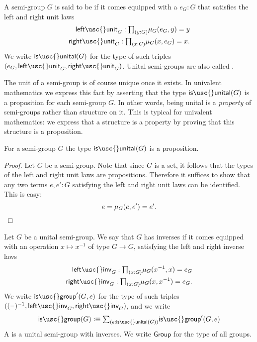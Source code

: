 \begin{defn}
  A semi-group $G$ is said to be  if it comes equipped with a  $e_G:G$ that satisfies the left and right unit laws
  \begin{align*}
    \mathsf{left\usc{}unit}_G : \prd{y:G}\mu_G(e_G,y)=y \\
    \mathsf{right\usc{}unit}_G : \prd{x:G}\mu_G(x,e_G)=x.
  \end{align*}
  We write $\mathsf{is\usc{}unital}(G)$ for the type of such triples $(e_G,\mathsf{left\usc{}unit}_G,\mathsf{right\usc{}unit}_G)$. Unital semi-groups are also called .
\end{defn}

The unit of a semi-group is of course unique once it exists. In univalent mathematics we express this fact by asserting that the type $\mathsf{is\usc{}unital}(G)$ is a proposition for each semi-group $G$. In other words, being unital is a \emph{property} of semi-groups rather than structure on it. This is typical for univalent mathematics: we express that a structure is a property by proving that this structure is a proposition.

\begin{lem}
  For a semi-group $G$ the type $\mathsf{is\usc{}unital}(G)$ is a proposition.
\end{lem}

\begin{proof}
  Let $G$ be a semi-group. Note that since $G$ is a set, it follows that the types of the left and right unit laws are propositions. Therefore it suffices to show that any two terms $e,e':G$ satisfying the left and right unit laws can be identified. This is easy:
  \begin{equation*}
    e = \mu_G(e,e') = e'.\qedhere
  \end{equation*}
\end{proof}

\begin{defn}
  Let $G$ be a unital semi-group. We say that $G$ has inverses if it comes equipped with an operation $x\mapsto x^{-1}$ of type $G\to G$, satisfying the left and right inverse laws
  \begin{align*}
    \mathsf{left\usc{}inv}_G : \prd{x:G}\mu_G(x^{-1},x)=e_G \\
    \mathsf{right\usc{}inv}_G : \prd{x:G}\mu_G(x,x^{-1}) = e_G.
  \end{align*}
  We write $\mathsf{is\usc{}group}'(G,e)$ for the type of such triples $((\blank)^{-1},\mathsf{left\usc{}inv}_G,\mathsf{right\usc{}inv}_G)$, and we write
  \begin{equation*}
    \mathsf{is\usc{}group}(G)\defeq\sm{e:\mathsf{is\usc{}unital}(G)}\mathsf{is\usc{}group}'(G,e)
  \end{equation*}
  A  is a unital semi-group with inverses. We write $\mathsf{Group}$ for the type of all groups.
\end{defn}

